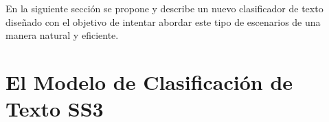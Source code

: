 En la siguiente sección se propone y describe un nuevo clasificador de texto diseñado con el objetivo de intentar abordar este tipo de escenarios de una manera natural y eficiente.




\section{El Modelo de Clasificación de Texto SS3}
\label{sec:ss3}


